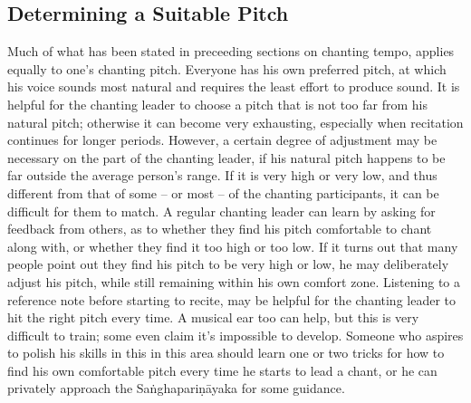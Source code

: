 \subsection*{Determining a Suitable Pitch}
\begin{justify}
  Much of what has been stated in preceeding sections on chanting tempo, applies equally to one's chanting pitch. Everyone has his own preferred pitch, at which his voice sounds most natural and requires the least effort to produce sound. It is helpful for the chanting leader to choose a pitch that is not too far from his natural pitch; otherwise it can become very exhausting, especially when recitation continues for longer periods. However, a certain degree of adjustment may be necessary on the part of the chanting leader, if his natural pitch happens to be far outside the average person's range. If it is very high or very low, and thus different from that of some -- or most -- of the chanting participants, it can be difficult for them to match. A regular chanting leader can learn by asking for feedback from others, as to whether they find his pitch comfortable to chant along with, or whether they find it too high or too low. If it turns out that many people point out they find his pitch to be very high or low, he may deliberately adjust his pitch, while still remaining within his own comfort zone. Listening to a reference note before starting to recite, may be helpful for the chanting leader to hit the right pitch every time. A musical ear too can help, but this is very difficult to train; some even claim it's impossible to develop. Someone who aspires to polish his skills in this in this area should learn one or two tricks for how to find his own comfortable pitch every time he starts to lead a chant, or he can privately approach the Saṅghapariṇāyaka for some guidance.
\end{justify}


